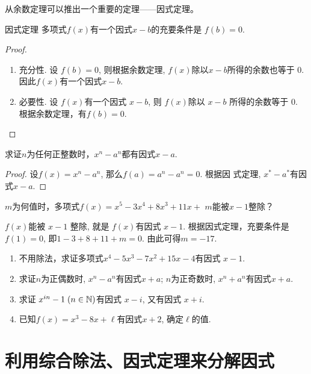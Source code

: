 从余数定理可以推出一个重要的定理——因式定理。

\begin{thm}
 {因式定理} 多项式$f(x)$有一个因式$x-b$的充要条件是
$f(b)=0$.   
\end{thm}

\begin{proof}
\begin{enumerate}[(1)]
\item 充分性. 设 $f(b)=0$, 则根据余数定理, $f(x)$除以$x-b$所得的余数也等于 0. 因此$f(x)$有一个因式$x-b$.
\item 必要性. 设 $f(x)$有一个因式 $x-b$, 则 $f(x)$除以 $x-b$
所得的余数等于 0. 根据余数定理，有$f(b)=0$.
\end{enumerate}
\end{proof}

\begin{example}
    求证$n$为任何正整数时，$x^n-a^n$都有因式$x-a$.
\end{example}

\begin{proof}
    设$f(x)=x^n-a^n$, 那么$f(a)=a^n-a^n=0$. 根据因
式定理, $x^*-a^*$有因式$x-a$.
\end{proof}

\begin{example}
    $m$为何值时，多项式$f(x)=x^5-3x^4+8x^3+11x+$
$m$能被$x-1$整除？
\end{example}

\begin{solution}
    $f(x)$能被 $x- 1$ 整除, 就是 $f(x)$有因式 $x-1$. 根据因式定理，充要条件是$f(1)=0$, 即$1-3+8+11+m=0$. 由此可得$m=-17$.
\end{solution}

\begin{ex}
\begin{enumerate}
\item 不用除法，求证多项式$x^4-5x^3-7x^2+15x-4$有因式
$x-1$.
\item 求证$n$为正偶数时, $x^n-a^n$有因式$x+a$; $n$为正奇数时, $x^n+a^{n}$有因式$x+a$.
\item 求证 $x^{in}-1\; (n\in \mathbb{N})$有因式 $x-i$, 又有因式 $x+i$. 
\item 已知$f(x)=x^3-8x+\ell$有因式$x+2$, 确定$\ell$的值.
\end{enumerate}    
\end{ex}

\section{利用综合除法、因式定理来分解因式}

